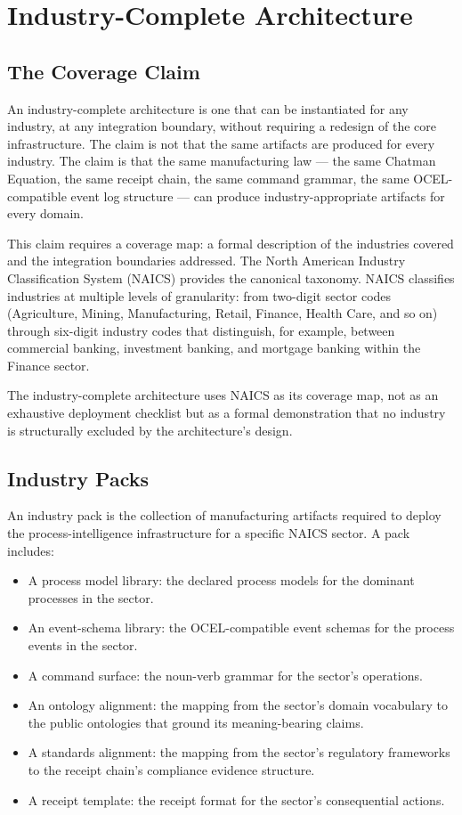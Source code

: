 \chapter{Industry-Complete Architecture}
\label{chap:industry_architecture}

\section{The Coverage Claim}

An industry-complete architecture is one that can be instantiated for any industry, at any integration boundary, without requiring a redesign of the core infrastructure. The claim is not that the same artifacts are produced for every industry. The claim is that the same manufacturing law --- the same Chatman Equation, the same receipt chain, the same command grammar, the same OCEL-compatible event log structure --- can produce industry-appropriate artifacts for every domain.

This claim requires a coverage map: a formal description of the industries covered and the integration boundaries addressed. The North American Industry Classification System (NAICS) provides the canonical taxonomy. NAICS classifies industries at multiple levels of granularity: from two-digit sector codes (Agriculture, Mining, Manufacturing, Retail, Finance, Health Care, and so on) through six-digit industry codes that distinguish, for example, between commercial banking, investment banking, and mortgage banking within the Finance sector.

The industry-complete architecture uses NAICS as its coverage map, not as an exhaustive deployment checklist but as a formal demonstration that no industry is structurally excluded by the architecture's design.

\section{Industry Packs}

An industry pack is the collection of manufacturing artifacts required to deploy the process-intelligence infrastructure for a specific NAICS sector. A pack includes:

\begin{itemize}
  \item A process model library: the declared process models for the dominant processes in the sector.
  \item An event-schema library: the OCEL-compatible event schemas for the process events in the sector.
  \item A command surface: the noun-verb grammar for the sector's operations.
  \item An ontology alignment: the mapping from the sector's domain vocabulary to the public ontologies that ground its meaning-bearing claims.
  \item A standards alignment: the mapping from the sector's regulatory frameworks to the receipt chain's compliance evidence structure.
  \item A receipt template: the receipt format for the sector's consequential actions.
\end{itemize}

